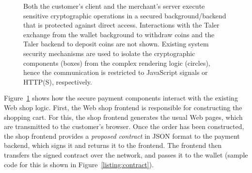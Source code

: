 \documentclass{llncs}
\begin{document}
\begin{figure}[t!]
\begin{center}
\end{center}
 \caption{Both the customer's client and the merchant's server
          execute sensitive cryptographic operations in a
          secured background/backend that is protected against direct access.
          Interactions with the Taler exchange from the wallet background
          to withdraw coins and the Taler backend
          to deposit coins are not shown.
          Existing system security mechanisms
          are used to isolate the cryptographic components (boxes) from
          the complex rendering logic (circles), hence the communication
          is restricted to JavaScript signals or HTTP(S), respectively.}
 \label{fig:frobearch}
\end{figure}

Figure~\ref{fig:frobearch} shows how the secure payment components
interact with the existing Web shop logic.  First, the Web shop
frontend is responsible for constructing the shopping cart.  For this,
the shop frontend generates the usual Web pages, which are transmitted
to the customer's browser.  Once the order has been constructed, the
shop frontend provides a {\em proposed contract} in JSON format to the
payment backend, which signs it and returns it to the frontend.  The
frontend then transfers the signed contract over the network, and
passes it to the wallet (sample code for this is shown in
Figure~\ref{listing:contract}).
\end{document}
